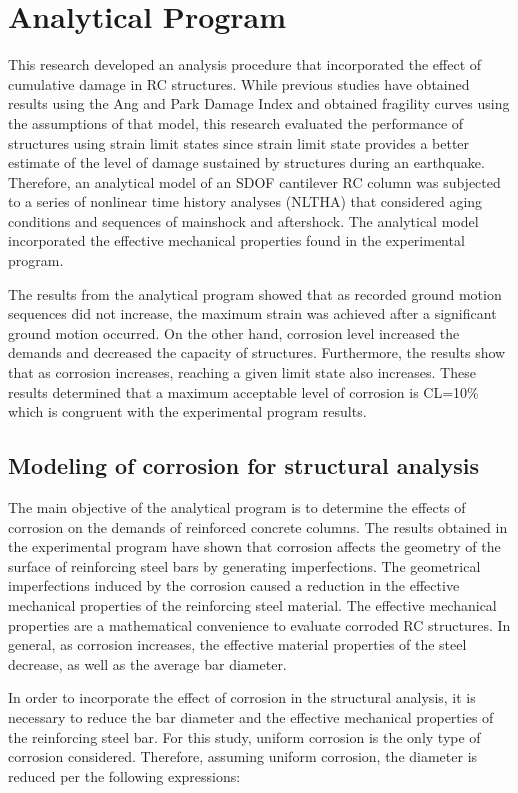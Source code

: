 \chapter{Analytical Program}
\label{chap-five}
This research developed an analysis procedure that incorporated the effect of cumulative damage in RC structures. While previous studies have obtained results using the Ang and Park Damage Index and obtained fragility curves using the assumptions of that model, this research evaluated the performance of structures using strain limit states since strain limit state provides a better estimate of the level of damage sustained by structures during an earthquake. Therefore, an analytical model of an SDOF cantilever RC column was subjected to a series of nonlinear time history analyses (NLTHA) that considered aging conditions and sequences of mainshock and aftershock. The analytical model incorporated the effective mechanical properties found in the experimental program. 

The results from the analytical program showed that as recorded ground motion sequences did not increase, the maximum strain was achieved after a significant ground motion occurred. On the other hand, corrosion level increased the demands and decreased the capacity of structures. Furthermore, the results show that as corrosion increases, reaching a given limit state also increases. These results determined that a maximum acceptable level of corrosion is CL=10\% which is congruent with the experimental program results.

\section{Modeling of corrosion for structural analysis}

The main objective of the analytical program is to determine the effects of corrosion on the demands of reinforced concrete columns. The results obtained in the experimental program have shown that corrosion affects the geometry of the surface of reinforcing steel bars by generating imperfections. The geometrical imperfections induced by the corrosion caused a reduction in the effective mechanical properties of the reinforcing steel material. The effective mechanical properties are a mathematical convenience to evaluate corroded RC structures. In general, as corrosion increases, the effective material properties of the steel decrease, as well as the average bar diameter.

In order to incorporate the effect of corrosion in the structural analysis, it is necessary to reduce the bar diameter and the effective mechanical properties of the reinforcing steel bar. For this study, uniform corrosion is the only type of corrosion considered. Therefore, assuming uniform corrosion, the diameter is reduced per the following expressions:

